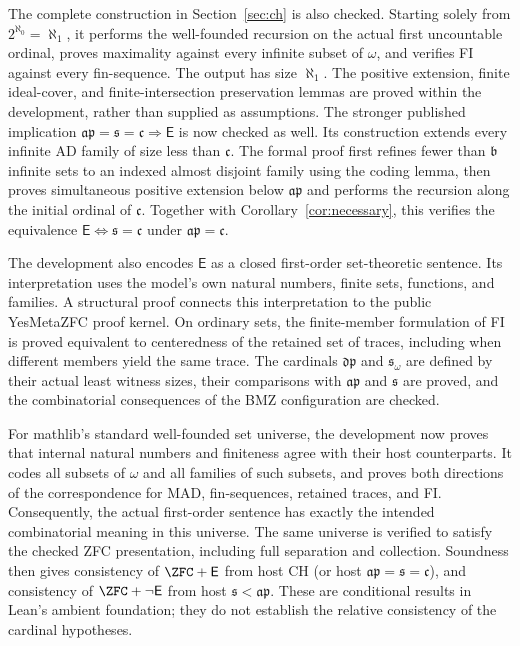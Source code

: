 \documentclass[11pt,letterpaper]{article}
\theoremstyle{definition}
\theoremstyle{remark}
\newcommand{\s}{\mathfrak{s}}
\newcommand{\bnum}{\mathfrak{b}}
\newcommand{\ap}{\mathfrak{ap}}
\newcommand{\dpnum}{\mathfrak{dp}}
\newcommand{\cont}{\mathfrak{c}}
\newcommand{\E}{\mathsf{E}}
\begin{document}
The complete construction in Section~\ref{sec:ch} is also checked.
Starting solely from $2^{\aleph_0}=\aleph_1$, it performs the well-founded
recursion on the actual first uncountable ordinal, proves maximality
against every infinite subset of $\omega$, and verifies FI against every
fin-sequence. The output has size $\aleph_1$. The positive extension,
finite ideal-cover, and finite-intersection preservation lemmas are
proved within the development, rather than supplied as assumptions.
The stronger published implication $\ap=\s=\cont\Rightarrow\E$ is now
checked as well. Its construction extends every infinite AD family of
size less than $\cont$. The formal proof first refines fewer than $\bnum$
infinite sets to an indexed almost disjoint family using the coding lemma,
then proves simultaneous positive extension below $\ap$ and performs the
recursion along the initial ordinal of $\cont$. Together with
Corollary~\ref{cor:necessary}, this verifies the equivalence
$\E\Leftrightarrow\s=\cont$ under $\ap=\cont$.

The development also encodes $\E$ as a closed first-order set-theoretic
sentence. Its interpretation uses the model's own natural numbers, finite
sets, functions, and families. A structural proof connects this interpretation
to the public YesMetaZFC proof kernel. On ordinary sets, the finite-member
formulation of FI is proved equivalent to centeredness of the retained set
of traces, including when different members yield the same trace.
The cardinals $\dpnum$ and $\s_\omega$ are defined by their actual least
witness sizes, their comparisons with $\ap$ and $\s$ are proved, and the
combinatorial consequences of the BMZ configuration are checked.

For mathlib's standard well-founded set universe, the development now
proves that internal natural numbers and finiteness agree with their host
counterparts. It codes all subsets of $\omega$ and all families of such
subsets, and proves both directions of the correspondence for MAD,
fin-sequences, retained traces, and FI. Consequently, the actual
first-order sentence has exactly the intended combinatorial meaning in
this universe. The same universe is verified to satisfy the checked ZFC
presentation, including full separation and collection. Soundness then
gives consistency of $\ZFC+\E$ from host CH (or host
$\ap=\s=\cont$), and consistency of $\ZFC+\neg\E$ from host
$\s<\ap$. These are conditional results in Lean's ambient foundation;
they do not establish the relative consistency of the cardinal hypotheses.
\end{document}

